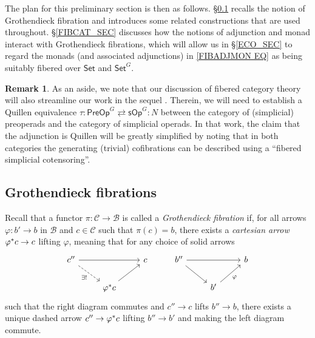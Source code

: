 \documentclass[a4paper,10pt
,draft
]{article}%
\numberwithin{equation}{section}
\numberwithin{figure}{section}
\theoremstyle{definition} %
\newtheorem{remark}[equation]{Remark}%
\newcommand{\1}{\ensuremath{\mathbbm 1}}%
\begin{document}
The plan for this preliminary section is then as follows.
%
\S \ref{GROTFIB SEC} recalls the notion of Grothendieck fibration and
introduces some related constructions that are used throughout.
%
\S \ref{FIBCAT_SEC} discusses how the notions of adjunction and monad interact with Grothendieck fibrations,
which will allow us in \S \ref{ECO_SEC}
to regard the monads
(and associated adjunctions)
in \eqref{FIBADJMON EQ}
as being suitably fibered over $\mathsf{Set}$ and $\mathsf{Set}^G$.
%


\begin{remark}
        As an aside,
        we note that our discussion of fibered category theory will
        also streamline our work in the sequel \cite{BP_TAS}.
        Therein, we will need to establish a Quillen equivalence
        $\tau \colon \mathsf{PreOp}^G \rightleftarrows \mathsf{sOp}^G\colon N$
        between the category of (simplicial) preoperads and
        the category of simplicial operads.
        In that work, the claim that the adjunction is Quillen 
        will be greatly simplified by noting that in both categories 
        the generating (trivial) cofibrations
        can be described using a ``fibered simplicial cotensoring''.
\end{remark}



\subsection{Grothendieck fibrations}\label{GROTFIB SEC}


Recall that a functor 
$\pi \colon \mathcal{C} \to \mathcal{B}$
is called a \emph{Grothendieck fibration} if,
for all arrows
$\varphi \colon b' \to b$ in $\mathcal{B}$
and $c \in \mathcal{C}$ such that $\pi(c) = b$,
there exists a \emph{cartesian arrow}
$\varphi^{\**}c \to c$
lifting $\varphi$,
meaning that for any choice of solid arrows
\begin{equation}\label{CARTARDEF EQ}
\begin{tikzcd}
c'' \ar{rr} \ar[dashed]{rd}[swap]{\exists!} 
&&
c
&%
b'' \ar{rr} \ar{rd} 
&&
b
\\
& \varphi^{\**} c \ar{ru}
&
&%
& b'\ar{ru}[swap]{\varphi}
&
\end{tikzcd}
\end{equation}
such that the right diagram commutes and 
$c'' \to c$ lifts $b'' \to b$,
there exists a unique dashed arrow
$c'' \to \varphi^{\**} c$ lifting $b'' \to b'$
and making the left diagram commute.
\end{document}
